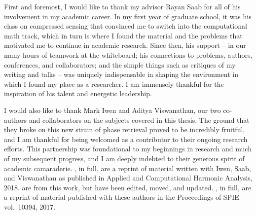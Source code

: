   First and foremost, I would like to thank my advisor Rayan Saab for all of his involvement in my academic career.  In my first year of graduate school, it was his class on compressed sensing that convinced me to switch into the computational math track, which in turn is where I found the material and the problems that motivated me to continue in academic research.  Since then, his support -- in our many hours of teamwork at the whiteboard; his connections to problems, authors, conferences, and collaborators; and the simple things such as critiques of my writing and talks -- was uniquely indispensable in shaping the environment in which I found my place as a researcher.  I am immensely thankful for the inspiration of his talent and energetic leadership.

  I would also like to thank Mark Iwen and Aditya Viswanathan, our two co-authors and collaborators on the subjects covered in this thesis.  The ground that they broke on this new strain of phase retrieval proved to be incredibly fruitful, and I am thankful for being welcomed as a contributor to their ongoing research efforts.  This partnership was foundational to my beginnings in research and much of my subsequent progress, and I am deeply indebted to their generous spirit of academic camaraderie.  , in full, are a reprint of material written with Iwen, Saab, and Viswanathan as published in Applied and Computational Harmonic Analysis, 2018.   are from this work, but have been edited, moved, and updated.  , in full, are a reprint of material published with these authors in the Proceedings of SPIE vol.~10394, 2017.
